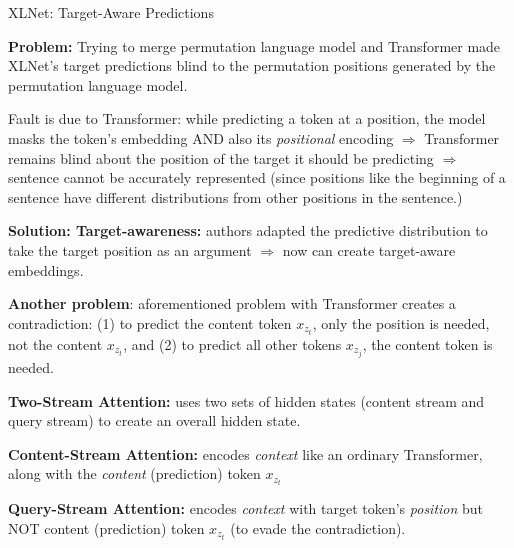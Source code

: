 \begin{frame}{XLNet: Target-Aware Predictions}
    \begin{itemizeSpaced}{5pt}
        \item {\color{Crimson} \textbf{Problem: }} Trying to merge permutation language model and Transformer made XLNet’s target predictions blind to the permutation positions generated by the permutation language model.

        \item Fault is due to Transformer: while predicting a token at a position, the model masks the token’s embedding AND also its \emph{positional} encoding $\Rightarrow$ Transformer remains blind about the position of the target it should be predicting $\Rightarrow$  sentence cannot be accurately represented (since positions like the beginning of a sentence have different distributions from other positions in the sentence.)
        
        \item {\color{ForestGreen} \textbf{Solution: Target-awareness: }} authors adapted the predictive distribution to take the target position as an argument $\Rightarrow$ now can create target-aware embeddings. 
        
        \item {\color{Crimson} \textbf{Another problem}: }aforementioned problem with Transformer creates a contradiction: (1) to predict the content token $x_{z_t}$, only the position is needed, not the content $x_{z_t}$, and (2) to predict all other tokens $x_{z_j}$, the content token is  needed. 
        
        \item {\color{ForestGreen} \textbf{Two-Stream Attention: }}uses two sets of hidden states (content stream and query stream) to create an overall hidden state. 
        
        {\linespread{0.3}
        \begin{itemizeSpaced}{5pt}
            \item \textbf{Content-Stream Attention: } encodes \emph{context} like an ordinary Transformer, along with the \emph{content} (prediction) token $x_{z_t}$
            
            \item \textbf{Query-Stream Attention: }encodes \emph{context} with target token's \emph{position} but NOT content (prediction) token $x_{z_t}$ (to evade the contradiction). 
        \end{itemizeSpaced} }
        
    \end{itemizeSpaced}
\end{frame}


